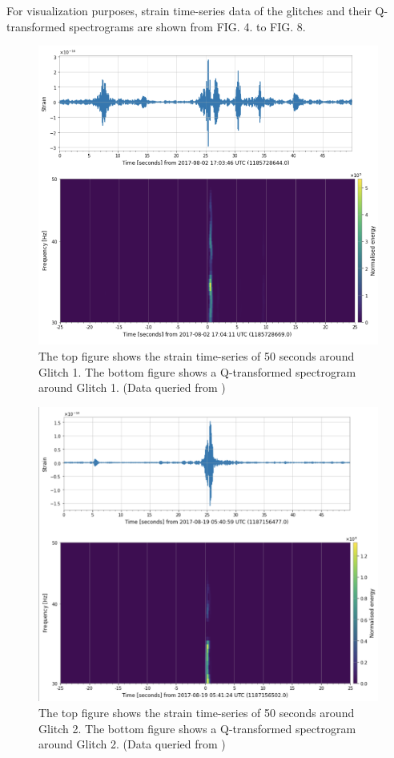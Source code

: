 \documentclass[reprint,
letterpaper,
 amsmath,amssymb,
 aps,
]{revtex4-2}
\begin{document}
For visualization purposes, strain time-series data of the glitches and their Q-transformed spectrograms are shown from FIG. 4. to FIG. 8.
\begin{figure}[h]
\caption{The top figure shows the strain time-series of 50 seconds around Glitch 1. The bottom figure shows a Q-transformed spectrogram around Glitch 1. (Data queried from \cite{collaboration2019open})}
\includegraphics[scale = .6]{loud 69 graphics.png}
\centering
\end{figure} 
\begin{figure}[h]
\caption{The top figure shows the strain time-series of 50 seconds around Glitch 2. The bottom figure shows a Q-transformed spectrogram around Glitch 2. (Data queried from \cite{collaboration2019open})}
\includegraphics[scale = .45]{loud 02 graphics.png}
\centering
\end{figure} 
\end{document}
